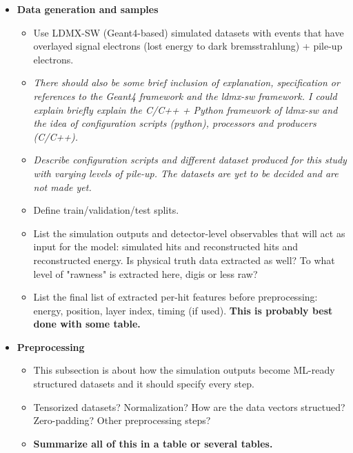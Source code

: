\begin{itemize}


\item \textbf{Data generation and samples}
\begin{itemize}
    \item Use LDMX-SW (Geant4-based) simulated datasets with events that have overlayed signal electrons (lost energy to dark bremsstrahlung) + pile-up electrons.
    \item \textit{There should also be some brief inclusion of explanation, specification or references to the Geant4 framework and the ldmx-sw framework. I could explain briefly explain the C/C++ + Python framework of ldmx-sw and the idea of configuration scripts (python), processors and producers (C/C++). }
    \item \textit{Describe configuration scripts and different dataset produced for this study with varying levels of pile-up. The datasets are yet to be decided and are not made yet.}
    \item Define train/validation/test splits.
    \item List the simulation outputs and detector-level observables that will act as input for the model: simulated hits and reconstructed hits and reconstructed energy. Is physical truth data extracted as well? To what level of "rawness" is extracted here, digis or less raw? 
    \item List the final list of extracted per-hit features before preprocessing: energy, position, layer index, timing (if used). \textbf{This is probably best done with some table.}
\end{itemize}

\item \textbf{Preprocessing}
\begin{itemize}
    \item This subsection is about how the simulation outputs become ML-ready structured datasets and it should specify every step.
    \item Tensorized datasets? Normalization? How are the data vectors structued? Zero-padding? Other preprocessing steps? 
    \item \textbf{Summarize all of this in a table or several tables.}
\end{itemize}



\end{itemize}
